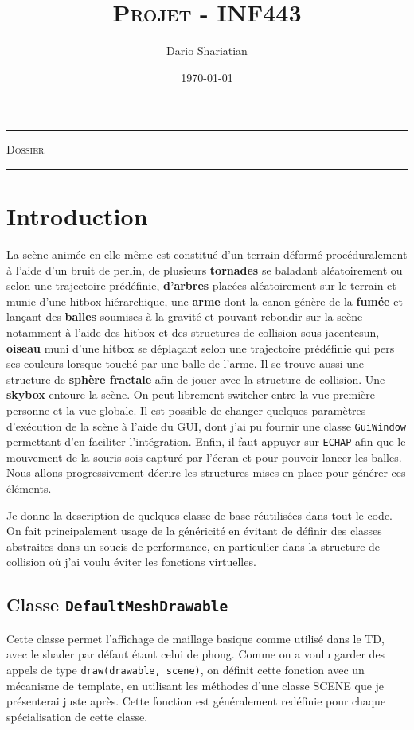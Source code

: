 \documentclass[10pt, a4paper]{article}
\title{\textsc{Projet - INF443}}
\author{Dario Shariatian}
\date{\today}
\theoremstyle{definition}
\begin{document}
\maketitle
\begin{center}
\rule{\textwidth}{1pt}
\textsc{Dossier}
\rule{\textwidth}{1pt}
\end{center}

\section*{Introduction}
La scène animée en elle-même est constitué d'un terrain déformé procéduralement à l'aide d'un bruit de perlin, de plusieurs \textbf{tornades} se baladant aléatoirement ou selon une trajectoire prédéfinie, \textbf{d'arbres} placées aléatoirement sur le terrain et munie d'une hitbox hiérarchique, une \textbf{arme} dont la canon génère de la \textbf{fumée} et lançant des \textbf{balles} soumises à la gravité et pouvant rebondir sur la scène notamment à l'aide des hitbox et des structures de collision sous-jacentesun, \textbf{oiseau} muni d'une hitbox se déplaçant selon une trajectoire prédéfinie qui pers ses couleurs lorsque touché par une balle de l'arme. Il se trouve aussi une structure de \textbf{sphère fractale} afin de jouer avec la structure de collision. Une \textbf{skybox} entoure la scène.
On peut librement switcher entre la vue première personne et la vue globale.
Il est possible de changer quelques paramètres d'exécution de la scène à l'aide du GUI, dont j'ai pu fournir une classe \texttt{GuiWindow} permettant d'en faciliter l'intégration. Enfin, il faut appuyer sur \texttt{ECHAP} afin que le mouvement de la souris sois capturé par l'écran et pour pouvoir lancer les balles.
Nous allons progressivement décrire les structures mises en place pour générer ces éléments.

\bigbreak

Je donne la description de quelques classe de base réutilisées dans tout le code. On fait principalement usage de la généricité en évitant de définir des classes abstraites dans un soucis de performance, en particulier dans la structure de collision où j'ai voulu éviter les fonctions virtuelles.
\smallbreak
\subsection{Classe \texttt{DefaultMeshDrawable}}
Cette classe permet l'affichage de maillage basique comme utilisé dans le TD, avec le shader par défaut étant celui de phong. Comme on a voulu garder des appels de type \texttt{draw(drawable, scene)}, on définit cette fonction avec un mécanisme de template, en utilisant les méthodes d'une classe SCENE que je présenterai juste après. Cette fonction est généralement redéfinie pour chaque spécialisation de cette classe.
\end{document}
